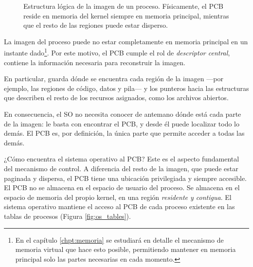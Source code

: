 \begin{figure}[!ht]
  \centering
  \caption{Estructura lógica de la imagen de un proceso. Físicamente, el PCB reside en memoria del kernel siempre en memoria principal, mientras que el resto de las regiones puede estar disperso.}
\end{figure}

La imagen del proceso puede no estar completamente en memoria principal en un instante dado\footnote{En el capítulo \ref{chpt:memoria} se estudiará en detalle el mecanismo de memoria virtual que hace esto posible, permitiendo mantener en memoria principal solo las partes necesarias en cada momento.}. Por este motivo, el PCB cumple el rol de \emph{descriptor central}, contiene la información necesaria para reconstruir la imagen.

En particular, guarda dónde se encuentra cada región de la imagen ---por ejemplo, las regiones de código, datos y pila--- y los punteros hacia las estructuras que describen el resto de los recursos asignados, como los archivos abiertos.

En consecuencia, el SO no necesita conocer de antemano dónde está cada parte de la imagen: le basta con encontrar el PCB, y desde él puede localizar todo lo demás. El PCB es, por definición, la única parte que permite acceder a todas las demás.

¿Cómo encuentra el sistema operativo al PCB? Este es el aspecto fundamental del mecanismo de control. A diferencia del resto de la imagen, que puede estar paginada y dispersa, el PCB tiene una ubicación privilegiada y siempre accesible. El PCB no se almacena en el espacio de usuario del proceso. Se almacena en el espacio de memoria del propio kernel, en una región \emph{residente y contigua}. El sistema operativo mantiene el acceso al PCB de cada proceso existente en las tablas de procesos (Figura \ref{fig:os_tables}).

